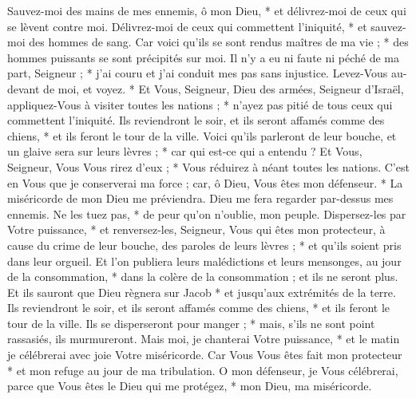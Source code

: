  Sauvez-moi des mains de mes ennemis, ô mon Dieu, * et délivrez-moi de ceux qui se lèvent contre moi.
\versseparator
 Délivrez-moi de ceux qui commettent l'iniquité, * et sauvez-moi des hommes de sang.
\versseparator
 Car voici qu'ils se sont rendus maîtres de ma vie ; * des hommes puissants se sont précipités sur moi.
\versseparator
 Il n'y a eu ni faute ni péché de ma part, Seigneur ; * j'ai couru et j'ai conduit mes pas sans injustice.
\versseparator
 Levez-Vous au-devant de moi, et voyez. * Et Vous, Seigneur, Dieu des armées,
\versseparator
 Seigneur d'Israël, appliquez-Vous à visiter toutes les nations ; * n'ayez pas pitié de tous ceux qui commettent l'iniquité.
\versseparator
 Ils reviendront le soir, et ils seront affamés comme des chiens, * et ils feront le tour de la ville.
\versseparator
 Voici qu'ils parleront de leur bouche, et un glaive sera sur leurs lèvres ; * car qui est-ce qui a entendu ?
\versseparator
 Et Vous, Seigneur, Vous Vous rirez d'eux ; * Vous réduirez à néant toutes les nations.
\versseparator
 C'est en Vous que je conserverai ma force ; car, ô Dieu, Vous êtes mon défenseur. * La miséricorde de mon Dieu me préviendra.
\versseparator
 Dieu me fera regarder par-dessus mes ennemis. Ne les tuez pas, * de peur qu'on n'oublie, mon peuple.
\versseparator
 Dispersez-les par Votre puissance, * et renversez-les, Seigneur, Vous qui êtes mon protecteur,
\versseparator
 à cause du crime de leur bouche, des paroles de leurs lèvres ; * et qu'ils soient pris dans leur orgueil.
\versseparator
 Et l'on publiera leurs malédictions et leurs mensonges, au jour de la consommation, * dans la colère de la consommation ; et ils ne seront plus.
\versseparator
 Et ils sauront que Dieu règnera sur Jacob * et jusqu'aux extrémités de la terre.
\versseparator
 Ils reviendront le soir, et ils seront affamés comme des chiens, * et ils feront le tour de la ville.
\versseparator
 Ils se disperseront pour manger ; * mais, s'ils ne sont point rassasiés, ils murmureront.
\versseparator
 Mais moi, je chanterai Votre puissance, * et le matin je célébrerai avec joie Votre miséricorde.
\versseparator
 Car Vous Vous êtes fait mon protecteur * et mon refuge au jour de ma tribulation.
\versseparator
 O mon défenseur, je Vous célébrerai, parce que Vous êtes le Dieu qui me protégez, * mon Dieu, ma miséricorde.